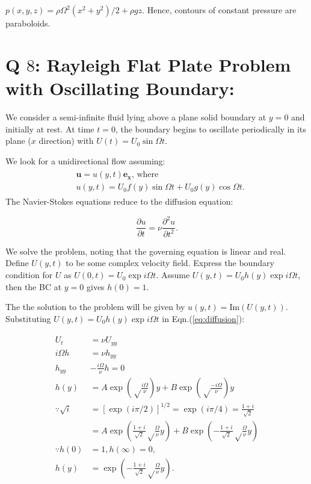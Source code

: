 \documentclass{article}
\begin{document}
$\boxed{p(x, y, z) = \rho \Omega^{2} (x^{2} + y^{2})/2 + \rho g z}$. Hence, contours of constant pressure are paraboloids. 
\section{Q $8$: Rayleigh Flat Plate Problem with Oscillating Boundary:}
We consider a semi-infinite fluid lying above a plane
solid boundary at $y = 0$ and initially at rest. At time $t = 0$, the boundary begins to oscillate
periodically in its plane ($x$ direction) with $U(t) = U_{0} \sin{\Omega t}$.

We look for a unidirectional flow assuming:
\begin{align}\label{eq:Rayleigh_flat_plate_ansatz}
 \begin{split}
  & \boldsymbol{u} = u(y, t) \boldsymbol{e_{x}} \textrm{, where}\\
  & u(y, t) = U_{0} f(y) \sin{\Omega t} + U_{0} g(y) \cos{\Omega t}.
 \end{split}
\end{align}
The Navier-Stokes equations reduce to the diffusion equation:

\begin{equation}\label{eq:diffusion}
 \frac{\partial u}{\partial t} = \nu \frac{\partial^{2} u}{\partial t^{2}}.
\end{equation}

We solve the problem, noting that the governing equation is linear and real. Define $U(y, t)$ to be some complex velocity field. Express the boundary condition for $U$ as $U(0, t) = U_{0} \exp{i\Omega t}$. Assume $U(y, t) = U_{0} h(y) \exp{i\Omega t}$, then the BC at $y=0$ gives $h(0) = 1$. 

The the solution to the problem will be given by $u(y, t) = \textrm{Im}(U(y, t))$. Substituting $U(y, t) = U_{0} h(y) \exp{i\Omega t}$ in Eqn.(\ref{eq:diffusion}):

\begin{align}\label{eq:substituting_ansatz}
 \begin{split}
  U_{t} &= \nu U_{yy} \\
  i \Omega h &= \nu h_{yy}\\
  h_{yy} &- \frac{i\Omega}{\nu} h = 0\\
  h(y)  &= A \exp{\left(\sqrt\frac{i\Omega}{\nu}\right)y} + B \exp{\left(\sqrt\frac{-i\Omega}{\nu}\right)y}\\
  \because \sqrt{i} &= [\exp{(i\pi/2)}]^{1/2} = \exp{(i\pi/4)} =  \frac{1 + i}{\sqrt{2}}\\
  & = A \exp{\left(\frac{1 + i}{\sqrt{2}} \sqrt\frac{\Omega}{\nu}  y \right)} + B \exp{\left(-\frac{1 + i}{\sqrt{2}} \sqrt\frac{\Omega}{\nu}  y \right)}\\
  \because h(0) &= 1, h(\infty) = 0, \\
  h(y) &= \exp{\left(-\frac{1 + i}{\sqrt{2}} \sqrt\frac{\Omega}{\nu}  y \right)}.
 \end{split}
\end{align}
\end{document}
